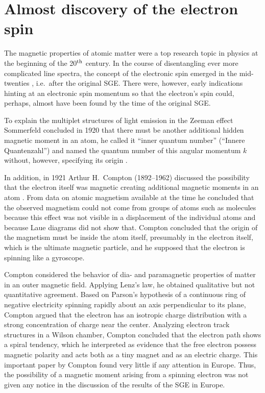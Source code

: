 \documentclass{article}
\begin{document}
\section{Almost discovery of the electron spin}

The magnetic properties of atomic matter were a top research topic in physics at the beginning of the 20$^{\rm th}$ century. In the course of disentangling ever more complicated line spectra, the concept of the electronic spin emerged in the mid-twenties \citep{TomonagaS1997Story}, i.e.\ after the original SGE. There were, however, early indications hinting at an electronic spin momentum so that the electron's spin could, perhaps, almost have been found by the time of the original SGE.

To explain the multiplet structures of light emission in the Zeeman effect Sommerfeld concluded in 1920 that there must be another additional hidden magnetic moment in an atom, he called it ``inner quantum number'' (``Innere Quantenzahl'') and named the quantum number of this angular momentum $k$ without, however, specifying its origin \citep{SommerfeldA1920Zahlenmysterium,SommerfeldA1920Gesetze}. 

In addition, in 1921 Arthur H.~Compton (1892--1962) discussed the possibility that the electron itself was magnetic creating additional magnetic moments in an atom \citep{ComptonAH1921electron,StuewerR1975Effect}. From data on atomic magnetism available at the time he concluded that the observed magnetism could not come from groups of atoms such as molecules because this effect was not visible in a displacement of the individual atoms and because Laue diagrams did not show that. Compton concluded that the origin of the magnetism must be inside the atom itself, presumably in the electron itself, which is the ultimate magnetic particle, and he supposed that the electron is spinning like a gyroscope.

Compton considered the behavior of dia- and paramagnetic properties of matter in an outer magnetic field. Applying Lenz's law, he obtained qualitative but not quantitative agreement. Based on Parson's hypothesis \citep{ParsonA1915Theory} of a continuous ring of negative electricity spinning rapidly about an axis perpendicular to its plane, Compton argued that the electron has an isotropic charge distribution with a strong concentration of charge near the center. Analyzing electron track structures in a Wilson chamber, Compton concluded that the electron path shows a spiral tendency, which he interpreted as evidence that the free electron possess magnetic polarity and acts both as a tiny magnet and as an electric charge. This important paper by Compton found very little if any attention in Europe. Thus, the possibility of a magnetic moment arising from a spinning electron was not given any notice in the discussion of the results of the SGE in Europe. 
\end{document}
